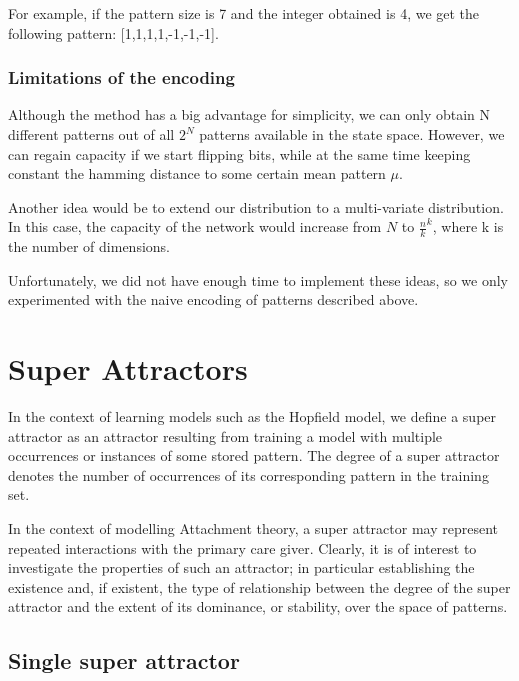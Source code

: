 For example, if the pattern size is 7 and the integer obtained is 4, we get the following pattern: [1,1,1,1,-1,-1,-1].

\subsubsection{Limitations of the encoding}

Although the method has a big advantage for simplicity, we can only obtain N different patterns out of all \( 2^N\) patterns available in the state space. However, we can regain capacity if we start flipping bits, while at the same time keeping constant the hamming distance to some certain mean pattern \(\mu\).

Another idea would be to extend our distribution to a multi-variate distribution. In this case, the capacity of the network would increase from \(N\) to \(\frac{n}{k}^k\), where k is the number of dimensions.

Unfortunately, we did not have enough time to implement these ideas, so we only experimented with the naive encoding of patterns described above.

\section{Super Attractors}
In the context of learning models such as the Hopfield model, we define a super attractor as an attractor resulting from training a model with multiple occurrences or instances of some stored pattern. The degree of a super attractor denotes the number of occurrences of its corresponding pattern in the training set.


In the context of modelling Attachment theory, a super attractor may represent repeated interactions with the primary care giver. Clearly, it is of interest to investigate the properties of such an attractor; in particular establishing the existence and, if existent, the type of relationship between the degree of the super attractor and the extent of its dominance, or stability, over the space of patterns.


\subsection{Single super attractor}

\newcommand{\psuper}{$p_{super}$}
\newcommand{\prandom}{$\overrightarrow{p}_{random}$}

